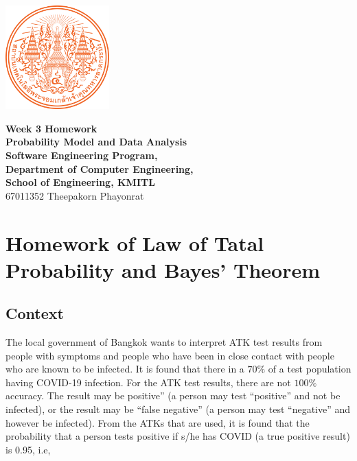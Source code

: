 \documentclass[12pt]{report} %
\begin{document}
\begin{titlepage}
	\centering
	\vspace*{1cm} %
	\includegraphics[width=0.3\textwidth]{../images/KMITL Logo.png} %

	\vspace{1cm} %
	{\LARGE \textbf{Week 3 Homework}} \\[0.5cm] %
	\vspace{0.5cm}
	{\large \textbf{Probability Model and Data Analysis}} \\[0.5cm]
    {\large \textbf{Software Engineering Program,}} \\[0.5cm]
	{\large \textbf{Department of Computer Engineering,}} \\[0.5cm]
	{\large \textbf{School of Engineering, KMITL}} \\[1cm]
	{\large 67011352 Theepakorn Phayonrat} \\[0.5cm] %
\end{titlepage}

\section*{Homework of Law of Tatal Probability and Bayes' Theorem}

\subsection*{Context}

The local government of Bangkok wants to interpret ATK test results
from people with symptoms and people who have been in close contact
with people who are known to be infected. It is found that there in
a $70\%$ of a test population having COVID-19 infection. For the ATK
test results, there are not $100\%$ accuracy. The result may be
positive” (a person may test “positive” and not be infected), or the
result may be “false negative” (a person may test “negative” and
however be infected). From the ATKs that are used, it is found that
the probability that a person tests positive if s/he has COVID (a true
positive result) is 0.95, i.e,
\end{document}
